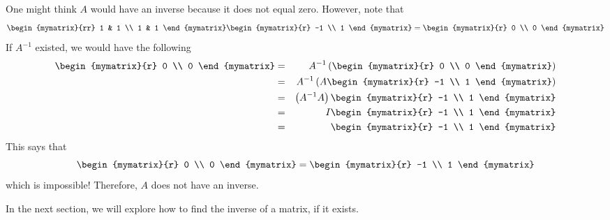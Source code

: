 \begin{solution} One might think $A$ would have an inverse because it does not equal zero.
However, note that 
\begin{equation*}
\begin{mymatrix}{rr}
1 & 1 \\
1 & 1
\end{mymatrix} \begin{mymatrix}{r}
-1 \\
1
\end{mymatrix} =\begin{mymatrix}{r}
0 \\
0
\end{mymatrix}
\end{equation*}
If $A^{-1}$ existed, we would have the following
\begin{eqnarray*}
\begin{mymatrix}{r}
0 \\
0
\end{mymatrix} &=& A^{-1}\left( \begin{mymatrix}{r}
0 \\
0
\end{mymatrix} \right) \\
&=& A^{-1}\left( A\begin{mymatrix}{r}
-1 \\
1
\end{mymatrix} \right) \\
&=&\left( A^{-1}A\right) \begin{mymatrix}{r}
-1 \\
1
\end{mymatrix} \\
&=&I\begin{mymatrix}{r}
-1 \\
1
\end{mymatrix} \\
&=&\begin{mymatrix}{r}
-1 \\
1
\end{mymatrix}
\end{eqnarray*}
This says that 
\begin{equation*}
\begin{mymatrix}{r}
0 \\
0
\end{mymatrix}
=
\begin{mymatrix}{r}
-1 \\
1
\end{mymatrix}
\end{equation*}
which is impossible! Therefore, $A$ does not have an inverse. 
\end{solution}

In the next section, we will explore how to find the inverse of a matrix, if it exists. 
